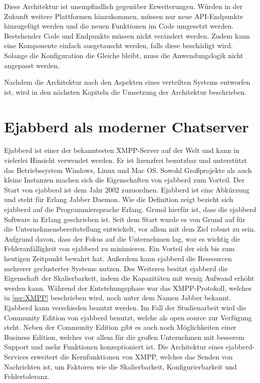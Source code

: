 \documentclass[a4paper,titlepage,halfparskip,12pt]{scrreprt}
\begin{document}
\begin{onehalfspacing}
Diese Architektur ist unempfindlich gegenüber Erweiterungen. Würden in der Zukunft weitere Plattformen hinzukommen, müssen nur neue \acs{API}-Endpunkte hinzugefügt werden und die neuen Funktionen im Code umgesetzt werden. Bestehender Code und Endpunkte müssen nicht verändert werden. Zudem kann eine Komponente einfach ausgetauscht werden, falls diese beschädigt wird. Solange die Konfiguration die Gleiche bleibt, muss die Anwendungslogik nicht angepasst werden.

Nachdem die Architektur nach den Aspekten eines verteilten Systems entworfen ist, wird in den nächsten Kapiteln die Umsetzung der Architektur beschrieben.

\pagebreak

\section{Ejabberd als moderner Chatserver}
\label{sec:ejabberd}

Ejabberd ist einer der bekanntesten \ac{XMPP}-Server auf der Welt und kann in vielerlei Hinsicht verwendet werden. Er ist lizenzfrei benutzbar und unterstützt das Betriebssystem Windows, Linux und Mac OS. Sowohl Großprojekte als auch kleine Instanzen machen sich die Eigenschaften von ejabberd zum Vorteil. Der Start von ejabberd ist dem Jahr 2002 zuzuordnen. Ejabberd ist eine Abkürzung und steht für \glqq Erlang Jabber Daemon\grqq. Wie die Definition zeigt bezieht sich ejabberd auf die Programmiersprache Erlang. Grund hierfür ist, dass die ejabberd Software in Erlang geschrieben ist. Seit dem Start wurde es von Grund auf für die Unternehmensbereitstellung entwickelt, vor allem mit dem Ziel robust zu sein. Aufgrund davon, dass der Fokus auf die Unternehmen lag, war es wichtig die Fehleranfälligkeit von ejabberd zu minimieren. Ein Vorteil der sich bis zum heutigen Zeitpunkt bewahrt hat. Außerdem kann ejabberd die Ressourcen mehrerer geclusterter Systeme nutzen. Des Weiteren besitzt ejabberd die Eigenschaft der Skalierbarkeit, indem die Kapazitäten mit wenig Aufwand erhöht werden kann. Während der Entstehungsphase war das \ac{XMPP}-Protokoll, welches in \autoref{sec:XMPP} beschrieben wird, noch unter dem Namen Jabber bekannt. Ejabberd kann verschieden benutzt werden. Im Fall der Studienarbeit wird die Community Edition von ejabberd benutzt, welche als open source zur Verfügung steht. Neben der Community Edition gibt es auch noch Möglichkeiten einer Business Edition, welches vor allem für die großen Unternehmen mit besserem Support und mehr Funktionen konzeptioniert ist. Die Architektur eines ejabberd-Services erweitert die Kernfunktionen von \ac{XMPP}, welches das Senden von Nachrichten ist, um Faktoren wie die Skalierbarkeit, Konfigurierbarkeit und Fehlertoleranz.


\end{onehalfspacing}
\end{document}
